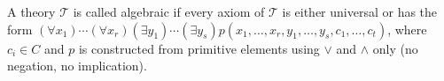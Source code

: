 A theory $\mathcal{T}$ is called algebraic if every axiom of $\mathcal{T}$ is either universal or has the form $(\forall x_1) \cdots (\forall x_r)(\exists y_1) \cdots (\exists y_s) p(x_1, \ldots, x_r, y_1, \ldots, y_s, c_1, \ldots, c_t)$, where $c_i \in C$ and $p$ is constructed from primitive elements using $\lor$ and $\land$ only (no negation, no implication).
